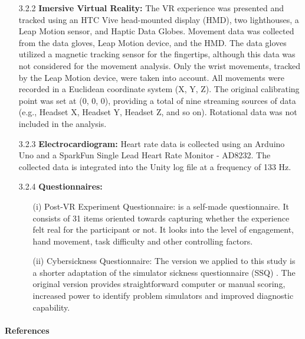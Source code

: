 \documentclass[12pt,oneside,openright]{report}
\begin{document}
\begin{enumerate}
    \item[3.2.2] \textbf{Imersive Virtual Reality:} The VR experience was presented and tracked using an HTC Vive head-mounted display (HMD), two lighthouses, a Leap Motion sensor, and Haptic Data Globes. Movement data was collected from the data gloves, Leap Motion device, and the HMD. The data gloves utilized a magnetic tracking sensor for the fingertips, although this data was not considered for the movement analysis. Only the wrist movements, tracked by the Leap Motion device, were taken into account. All movements were recorded in a Euclidean coordinate system (X, Y, Z). The original calibrating point was set at (0, 0, 0), providing a total of nine streaming sources of data (e.g., Headset X, Headset Y, Headset Z, and so on). Rotational data was not included in the analysis.

    \item[3.2.3] \textbf{Electrocardiogram:} Heart rate data is collected using an Arduino Uno and a SparkFun Single Lead Heart Rate Monitor - AD8232. The collected data is integrated into the Unity log file at a frequency of 133 Hz.

    \item[3.2.4] \textbf{Questionnaires:}
      \begin{enumerate}
        \item[(i)] Post-VR Experiment Questionnaire: is a self-made questionnaire. It consists of 31 items oriented towards capturing whether the experience felt real for the participant or not. It looks into the level of engagement, hand movement, task difficulty and other controlling factors. 
        \item[(ii)] Cybersickness Questionnaire: The version we applied to this study is a shorter adaptation of the simulator sickness questionnaire (SSQ) \cite*{SSQ93}. The original version provides straightforward computer or manual scoring, increased power to identify problem simulators and improved diagnostic capability.
    \end{enumerate}
  \end{enumerate}
\pagebreak
\paragraph{\textbf{References}}
\printbibliography[heading=none]
\end{document}
